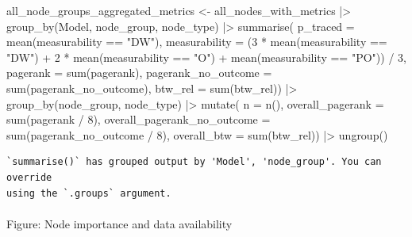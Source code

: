 \documentclass[
  letterpaper,
  DIV=11,
  numbers=noendperiod]{scrartcl}
\makeatletter
\let\oldparagraph\paragraph
\renewcommand{\paragraph}{
    \@ifstar
      \xxxParagraphStar
      \xxxParagraphNoStar
  }
\newcommand{\xxxParagraphStar}[1]{\oldparagraph*{#1}\mbox{}}
\newcommand{\xxxParagraphNoStar}[1]{\oldparagraph{#1}\mbox{}}
\newenvironment{Shaded}{\begin{snugshade}}{\end{snugshade}}
\newcommand{\AttributeTok}[1]{\textcolor[rgb]{0.40,0.45,0.13}{#1}}
\newcommand{\DecValTok}[1]{\textcolor[rgb]{0.68,0.00,0.00}{#1}}
\newcommand{\FunctionTok}[1]{\textcolor[rgb]{0.28,0.35,0.67}{#1}}
\newcommand{\NormalTok}[1]{\textcolor[rgb]{0.00,0.23,0.31}{#1}}
\newcommand{\OtherTok}[1]{\textcolor[rgb]{0.00,0.23,0.31}{#1}}
\newcommand{\SpecialCharTok}[1]{\textcolor[rgb]{0.37,0.37,0.37}{#1}}
\newcommand{\StringTok}[1]{\textcolor[rgb]{0.13,0.47,0.30}{#1}}
\makeatother
\begin{document}
\begin{Shaded}
\begin{Highlighting}[]
\NormalTok{all\_node\_groups\_aggregated\_metrics }\OtherTok{\textless{}{-}} 
\NormalTok{    all\_nodes\_with\_metrics }\SpecialCharTok{|\textgreater{}} 
    \FunctionTok{group\_by}\NormalTok{(Model, node\_group, node\_type) }\SpecialCharTok{|\textgreater{}} 
    \FunctionTok{summarise}\NormalTok{(}
        \AttributeTok{p\_traced =} \FunctionTok{mean}\NormalTok{(measurability }\SpecialCharTok{==} \StringTok{"DW"}\NormalTok{),}
        \AttributeTok{measurability =}\NormalTok{ (}\DecValTok{3} \SpecialCharTok{*} \FunctionTok{mean}\NormalTok{(measurability }\SpecialCharTok{==} \StringTok{"DW"}\NormalTok{) }\SpecialCharTok{+}
                             \DecValTok{2} \SpecialCharTok{*} \FunctionTok{mean}\NormalTok{(measurability }\SpecialCharTok{==} \StringTok{"O"}\NormalTok{) }\SpecialCharTok{+}
                             \FunctionTok{mean}\NormalTok{(measurability }\SpecialCharTok{==} \StringTok{"PO"}\NormalTok{)) }\SpecialCharTok{/} \DecValTok{3}\NormalTok{,}
        \AttributeTok{pagerank =} \FunctionTok{sum}\NormalTok{(pagerank),}
              \AttributeTok{pagerank\_no\_outcome =} \FunctionTok{sum}\NormalTok{(pagerank\_no\_outcome),}
              \AttributeTok{btw\_rel =} \FunctionTok{sum}\NormalTok{(btw\_rel)) }\SpecialCharTok{|\textgreater{}} 
    \FunctionTok{group\_by}\NormalTok{(node\_group, node\_type) }\SpecialCharTok{|\textgreater{}} 
    \FunctionTok{mutate}\NormalTok{(}
        \AttributeTok{n =} \FunctionTok{n}\NormalTok{(),}
        \AttributeTok{overall\_pagerank =} \FunctionTok{sum}\NormalTok{(pagerank }\SpecialCharTok{/} \DecValTok{8}\NormalTok{),}
           \AttributeTok{overall\_pagerank\_no\_outcome =} \FunctionTok{sum}\NormalTok{(pagerank\_no\_outcome }\SpecialCharTok{/} \DecValTok{8}\NormalTok{),}
           \AttributeTok{overall\_btw =} \FunctionTok{sum}\NormalTok{(btw\_rel)) }\SpecialCharTok{|\textgreater{}} 
    \FunctionTok{ungroup}\NormalTok{()}
\end{Highlighting}
\end{Shaded}

\begin{verbatim}
`summarise()` has grouped output by 'Model', 'node_group'. You can override
using the `.groups` argument.
\end{verbatim}

\paragraph{Figure: Node importance and data
availability}\label{figure-node-importance-and-data-availability}
\end{document}
